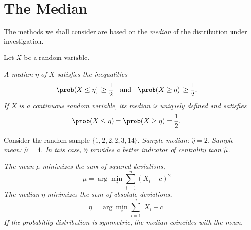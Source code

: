 \section{The Median}
The methods we shall consider are based on the \emph{median} of the distribution under investigation.

\vspace*{1ex}
Let $X$ be a random variable.%

\ben
\it A median $\eta$ of $X$ satisfies the inequalities
\[
\prob(X\leq\eta)\,\geq\frac{1}{2} \quad\text{and}\quad \prob(X\geq\eta)\,\geq\frac{1}{2}.
\]
\it If $X$ is a continuous random variable, its median is uniquely defined and satisfies
\[
\prob(X\leq\eta) = \prob(X\geq\eta) = \frac{1}{2}.
\]
\een

\begin{example}
Consider the random sample $\{1, 2, 2, 2, 3, 14\}$.
\bit
\it Sample median: $\hat{\eta} = 2$.
\it Sample mean:   $\hat{\mu}  = 4$.
\eit
In this case, $\hat{\eta}$ provides a better indicator of centrality than $\hat{\mu}$.
\end{example}

\begin{remark}
\bit
\it The mean $\mu$ minimizes the sum of squared deviations,
\[
\mu = \arg\min_c\sum_{i=1}^n (X_i-c)^2
\]
\it The median $\eta$ minimizes the sum of absolute deviations,
\[
\eta = \arg\min_c\sum_{i=1}^n |X_i-c|
\]
\it If the probability distribution is \emph{symmetric}, the median coincides with the mean.
\eit
\end{remark}

\endinput

\lecture[31]{The Sign Test}

For a random sample $X_1, X_2, . . . , X_n$ of observations from a distribution with (unknown) median $\eta$, the \emph{sign test} evaluates the null hypothesis $H_0:\eta=\eta_0$ against a suitable alternative. To apply the sign test, we need that
%
%
%
\ben
\it the distribution is continuous,
\it the observations can be ranked, and
\it the observations are independent.
\een

